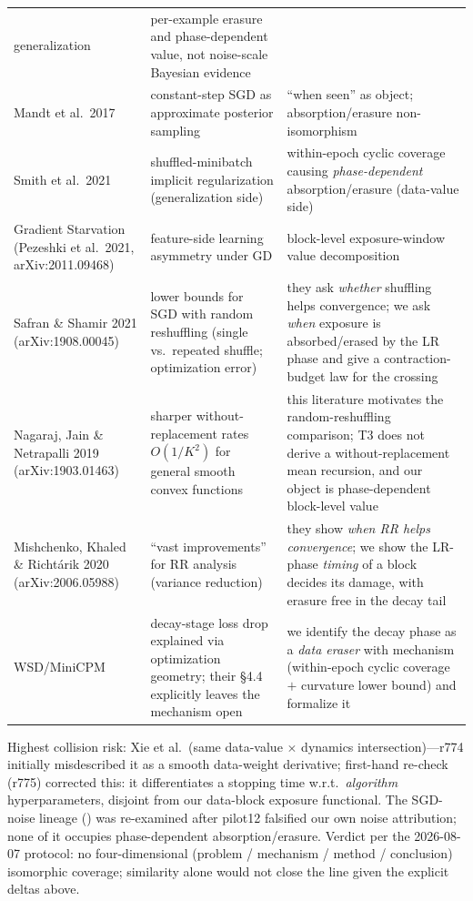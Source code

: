 \documentclass{article}
\begin{document}
\begin{center}
\begin{tabular}{@{}p{}p{}p{}@{}}
generalization & per-example erasure and phase-dependent value, not noise-scale Bayesian
evidence \\
Mandt et al.\ 2017 \citep{mandt2017sgd} & constant-step SGD as approximate posterior
sampling & ``when seen'' as object; absorption/erasure non-isomorphism \\
Smith et al.\ 2021 \citep{smith2021origin} & shuffled-minibatch implicit regularization
(generalization side) & within-epoch cyclic coverage causing \emph{phase-dependent}
absorption/erasure (data-value side) \\
Gradient Starvation (Pezeshki et al.\ 2021, arXiv:2011.09468) & feature-side learning
asymmetry under GD & block-level exposure-window value decomposition \\
Safran \& Shamir 2021 (arXiv:1908.00045) & lower bounds for SGD with random reshuffling
(single vs.\ repeated shuffle; optimization error) & they ask \emph{whether} shuffling
helps convergence; we ask \emph{when} exposure is absorbed/erased by the LR phase and give a
contraction-budget law for the crossing \\
Nagaraj, Jain \& Netrapalli 2019 (arXiv:1903.01463) & sharper without-replacement rates
$O(1/K^2)$ for general smooth convex functions & this literature motivates the random-reshuffling
comparison; T3 does not derive a without-replacement mean recursion, and our object is
phase-dependent block-level value \\
Mishchenko, Khaled \& Richt\'arik 2020 (arXiv:2006.05988) & ``vast improvements'' for RR
analysis (variance reduction) & they show \emph{when RR helps convergence}; we show the
LR-phase \emph{timing} of a block decides its damage, with erasure free in the decay tail \\
WSD/MiniCPM \citep{hu2024minicpm} & decay-stage loss drop explained via optimization
geometry; their \S4.4 explicitly leaves the mechanism open & we identify the decay phase as a
\emph{data eraser} with mechanism (within-epoch cyclic coverage $+$ curvature lower bound)
and formalize it \\
\bottomrule
\end{tabular}
\end{center}

\noindent Highest collision risk: Xie et al.\ (same data-value $\times$ dynamics
intersection)---r774 initially misdescribed it as a smooth data-weight derivative;
first-hand re-check (r775) corrected this: it differentiates a stopping time w.r.t.\
\emph{algorithm} hyperparameters, disjoint from our data-block exposure functional. The
SGD-noise lineage (\citealp{smith2017bayesian,mandt2017sgd,smith2021origin}) was re-examined
after pilot12 falsified our own noise attribution; none of it occupies phase-dependent
absorption/erasure. Verdict per the 2026-08-07 protocol: no four-dimensional (problem /
mechanism / method / conclusion) isomorphic coverage; similarity alone would not close the
line given the explicit deltas above.
\end{document}
